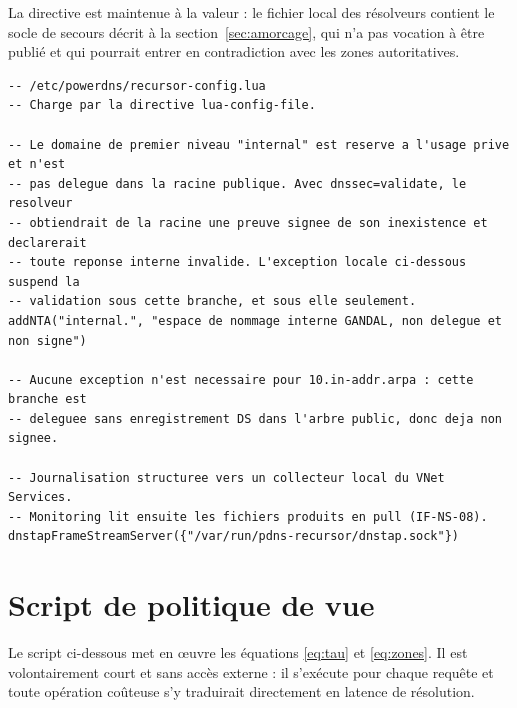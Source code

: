 La directive  est maintenue à la valeur  : le
fichier  local des résolveurs contient le socle de secours décrit à la
section~\ref{sec:amorcage}, qui n'a pas vocation à être publié et qui pourrait
entrer en contradiction avec les zones autoritatives.

\begin{lstlisting}[language=luapdns,caption={Configuration Lua du résolveur :
  exception de validation et journalisation},label=lst:reclua]
-- /etc/powerdns/recursor-config.lua
-- Charge par la directive lua-config-file.

-- Le domaine de premier niveau "internal" est reserve a l'usage prive et n'est
-- pas delegue dans la racine publique. Avec dnssec=validate, le resolveur
-- obtiendrait de la racine une preuve signee de son inexistence et declarerait
-- toute reponse interne invalide. L'exception locale ci-dessous suspend la
-- validation sous cette branche, et sous elle seulement.
addNTA("internal.", "espace de nommage interne GANDAL, non delegue et non signe")

-- Aucune exception n'est necessaire pour 10.in-addr.arpa : cette branche est
-- deleguee sans enregistrement DS dans l'arbre public, donc deja non signee.

-- Journalisation structuree vers un collecteur local du VNet Services.
-- Monitoring lit ensuite les fichiers produits en pull (IF-NS-08).
dnstapFrameStreamServer({"/var/run/pdns-recursor/dnstap.sock"})
\end{lstlisting}

\section{Script de politique de vue}
\label{sec:script}

Le script ci-dessous met en \oe uvre les équations \eqref{eq:tau} et
\eqref{eq:zones}. Il est volontairement court et sans accès externe : il
s'exécute pour chaque requête et toute opération coûteuse s'y traduirait
directement en latence de résolution.


